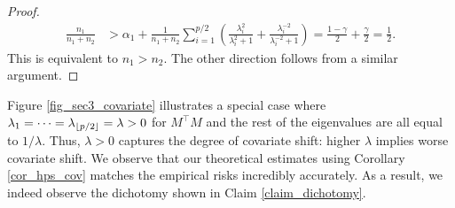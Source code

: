 \begin{example}
\begin{proof}
    \begin{align*}
     \frac{n_1}{n_1 + n_2} &> \alpha_1 + \frac{1}{n_1+n_2} \sum_{i=1}^{p/2}\left(\frac{\lambda_i^2}{\lambda_i^2+1}+\frac{\lambda_i^{-2}}{\lambda_i^{-2}+1}\right) = \frac{1-\gamma}{2}+\frac{\gamma}{2}=\frac{1}{2}.
    \end{align*}
    This is equivalent to $n_1>n_2$. The other direction follows from a similar argument. %
\end{proof}

Figure \ref{fig_sec3_covariate} illustrates a special case where $\lambda_1 = \cdots = \lambda_{\lfloor {p /2} \rfloor} = \lambda > 0$ for $M^{\top}M$ and the rest of the eigenvalues are all equal to $1 / \lambda$.
Thus, $\lambda > 0$ captures the degree of covariate shift: higher $\lambda$ implies worse covariate shift.
We observe that our theoretical estimates using Corollary \ref{cor_hps_cov} matches the empirical risks incredibly accurately.
As a result, we indeed observe the dichotomy shown in Claim \ref{claim_dichotomy}.
\end{example}


